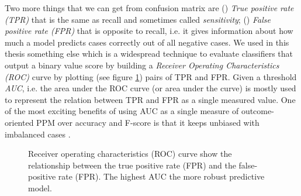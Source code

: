 Two more things that we can get from confusion matrix are () \textit{True positive rate (TPR)} that is the same as recall and sometimes called \textit{sensitivity}; () \textit{False positive rate (FPR)} that is opposite to recall, i.e. it gives information about how much a model predicts cases correctly out of all negative cases. We used in this thesis something else which is a widespread technique to evaluate classifiers that output a binary value score by building a  \textit{Receiver Operating Characteristics (ROC)} curve by plotting (see figure \ref{fig:roc}) pairs of TPR and FPR. Given a threshold  \textit{AUC}, i.e. the area under the ROC curve (or area under the curve) is mostly used to represent the relation between TPR and FPR as a single measured value. One of the most exciting benefits of using AUC as a single measure of outcome-oriented PPM over accuracy and F-score is that it keeps unbiased with imbalanced cases \cite{bradley1997use}. 

\begin{figure}[htb]
	\begin{center}
		\caption[ROC curve]{Receiver operating characteristics (ROC) curve show the relationship between the true positive rate (FPR) and the false-positive rate (FPR). The highest AUC the more robust predictive model.}
		\label{fig:roc}
	\end{center}
\end{figure}



